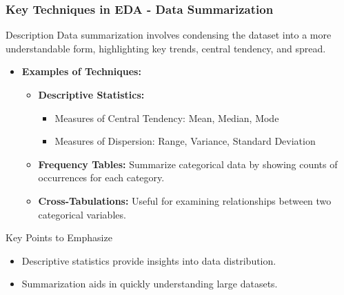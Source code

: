 \documentclass[aspectratio=169]{beamer}
\begin{document}
\begin{frame}[fragile]
    \frametitle{Key Techniques in EDA - Data Summarization}
    \begin{block}{Description}
        Data summarization involves condensing the dataset into a more understandable form, highlighting key trends, central tendency, and spread.
    \end{block}
    \begin{itemize}
        \item \textbf{Examples of Techniques:}
        \begin{itemize}
            \item \textbf{Descriptive Statistics:} 
            \begin{itemize}
                \item Measures of Central Tendency: Mean, Median, Mode
                \item Measures of Dispersion: Range, Variance, Standard Deviation
            \end{itemize}
            \item \textbf{Frequency Tables:} Summarize categorical data by showing counts of occurrences for each category.
            \item \textbf{Cross-Tabulations:} Useful for examining relationships between two categorical variables.
        \end{itemize}
    \end{itemize}
    \begin{block}{Key Points to Emphasize}
        \begin{itemize}
            \item Descriptive statistics provide insights into data distribution.
            \item Summarization aids in quickly understanding large datasets.
        \end{itemize}
    \end{block}
\end{frame}
\end{document}
